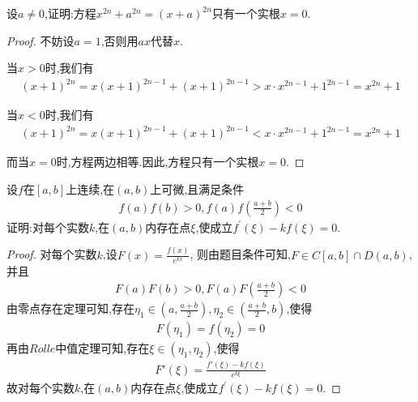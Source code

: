 \documentclass[lang=cn,newtx,10pt,scheme=chinese]{../Template/elegantbook}
\begin{document}
\begin{exercise}
设\(a\neq0\),证明:方程\(x^{2n}+a^{2n}=(x + a)^{2n}\)只有一个实根\(x = 0\).
\end{exercise}    
\begin{proof}
        不妨设$a=1$,否则用$ax$代替$x$.

        当$x>0$时,我们有
        \begin{gather}
            (x+1)^{2n}=x(x+1)^{2n-1}+(x+1)^{2n-1}>x\cdot x^{2n-1}+1^{2n-1}=x^{2n}+1
            \nonumber
        \end{gather}

        当$x<0$时,我们有
        \begin{gather}
            (x+1)^{2n}=x(x+1)^{2n-1}+(x+1)^{2n-1}<x\cdot x^{2n-1}+1^{2n-1}=x^{2n}+1
            \nonumber
        \end{gather}

        而当$x=0$时,方程两边相等.因此,方程只有一个实根$x=0$.

\end{proof}


\begin{exercise}
    设\(f\)在\([a,b]\)上连续,在\((a,b)\)上可微,且满足条件
    \begin{gather}
        f(a)f(b)>0,f(a)f\left(\frac{a + b}{2}\right)<0
        \nonumber
    \end{gather}
    证明:对每个实数\(k\),在\((a,b)\)内存在点\(\xi\),使成立\(f^{\prime}(\xi)-kf(\xi)=0\).
\end{exercise}
\begin{proof}
        对每个实数$k$,设$F\left( x \right) =\frac{f\left( x \right)}{e^{kx}}$,
        则由题目条件可知,$F\in C\left[ a,b \right] \cap D\left( a,b \right)$,并且
        \begin{gather}
            F\left( a \right) F\left( b \right) >0,F\left( a \right) F\left( \frac{a+b}{2} \right) <0
            \nonumber
        \end{gather}
        由零点存在定理可知,存在$\eta_1\in(a,\frac{a+b}{2}),\eta_2\in(\frac{a+b}{2},b)$,使得
        \begin{gather}
            F(\eta_1)=f(\eta_2)=0
            \nonumber
        \end{gather}
        再由$Rolle$中值定理可知,存在$\xi\in(\eta_1,\eta_2)$,使得
        \begin{gather}
            F'\left( \xi \right) =\frac{f'\left( \xi \right) -kf\left( \xi \right)}{e^{k\xi}}
            \nonumber
        \end{gather}
        故对每个实数\(k\),在\((a,b)\)内存在点\(\xi\),使成立\(f^{\prime}(\xi)-kf(\xi)=0\).

\end{proof}
\end{document}
